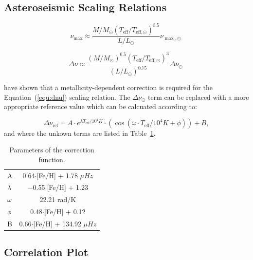 \subsection{Asteroseismic Scaling Relations}


\begin{equation}
\nu_{\max} \approx \frac{ M/M_{\odot}(T_{\text{eff}}/T_{\text{eff},\odot})^{3.5}}{L/L_{\odot}} \nu_{\max,\odot} \: 
\label{equ:nmax}
\end{equation}

\begin{equation}
\Delta\nu \approx \frac{(M/M_{\odot})^{0.5}(T_{\text{eff}}/T_{\text{eff},\odot})^{3}}{(L/L_{\odot})^{0.75}}
\Delta\nu_{\odot} \: 
\label{equ:dnu}
\end{equation}

\citet{2016MNRAS.460.4277G} have shown that a metallicity-dependent correction is required for the Equation~(\ref{equ:dnu}) scaling relation.
The ${\Delta\nu_{\odot}}$ term can be replaced with a more appropriate reference value which can be calcuated according to:


\begin{equation}
\Delta\nu_{\text{ref}}= A \cdot e^{\lambda T_{\text{eff}}/10^4K} \cdot (\cos(\omega \cdot T_{\text{eff}}/10^4K+\phi))+B,
\label{eq:corrfunc2}
\end{equation}
and where the unkown terms are listed in Table~\ref{tab:pars2}. 

 
\begin{table}
	\centering
	\caption{Parameters of the correction function.}
	\label{tab:pars2}
	\begin{tabular}{lc} %
		\hline
		A & 0.64$\cdot$[Fe/H] + 1.78  $\mu Hz$ \\
		$\lambda$ & $-$0.55$\cdot$[Fe/H] + 1.23  \\
		$\omega$ & 22.21 rad/K \\
		$\phi$ & 0.48$\cdot$[Fe/H] + 0.12 \\
		B & 0.66$\cdot$[Fe/H] + 134.92 $\mu Hz$ \\
		\hline
	\end{tabular}
\end{table}




\subsection{Correlation Plot} 
\label{sec:fullcorr}


